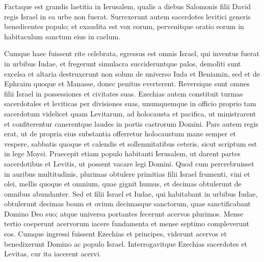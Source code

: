\begin{biblechapter}
\begin{biblechapter}
\begin{biblechapter}
\begin{biblechapter}
\begin{biblechapter}
\begin{biblechapter}
\begin{biblechapter}
\begin{biblechapter}
\begin{biblechapter}
\begin{biblechapter}
\begin{biblechapter}
\begin{biblechapter}
\begin{biblechapter}
\begin{biblechapter}
\begin{biblechapter}
\begin{biblechapter}
\begin{biblechapter}
\begin{biblechapter}
\begin{biblechapter}
\begin{biblechapter}
\begin{biblechapter}
\begin{biblechapter}
\begin{biblechapter}
\begin{biblechapter}
\begin{biblechapter}
\begin{biblechapter}
\begin{biblechapter}
\begin{biblechapter}
\begin{biblechapter}
\begin{biblechapter}
\verse Factaque est grandis laetitia in Ierusalem, qualis a diebus Salomonis filii David regis Israel in ea urbe non fuerat. 
\verse Surrexerunt autem sacerdotes levitici generis benedicentes populo; et exaudita est vox eorum, pervenitque oratio eorum in habitaculum sanctum eius in caelum.
 
\begin{biblechapter}
\verse Cumque haec fuissent rite celebrata, egressus est omnis Israel, qui inventus fuerat in urbibus Iudae, et fregerunt simulacra succideruntque palos, demoliti sunt excelsa et altaria destruxerunt non solum de universo Iuda et Beniamin, sed et de Ephraim quoque et Manasse, donec penitus everterent. Reversique sunt omnes filii Israel in possessiones et civitates suas.
 \verse Ezechias autem constituit turmas sacerdotales et leviticas per divisiones suas, unumquemque in officio proprio tam sacerdotum videlicet quam Levitarum, ad holocausta et pacifica, ut ministrarent et confiterentur canerentque laudes in portis castrorum Domini.
 \verse Pars autem regis erat, ut de propria eius substantia offerretur holocaustum mane semper et vespere, sabbatis quoque et calendis et sollemnitatibus ceteris, sicut scriptum est in lege Moysi.
 \verse Praecepit etiam populo habitanti Ierusalem, ut darent partes sacerdotibus et Levitis, ut possent vacare legi Domini.
 \verse Quod cum percrebruisset in auribus multitudinis, plurimas obtulere primitias filii Israel frumenti, vini et olei, mellis quoque et omnium, quae gignit humus, et decimas obtulerunt de omnibus abundanter. 
\verse Sed et filii Israel et Iudae, qui habitabant in urbibus Iudae, obtulerunt decimas boum et ovium decimasque sanctorum, quae sanctificabant Domino Deo suo; atque universa portantes fecerunt acervos plurimos.
 \verse Mense tertio coeperunt acervorum iacere fundamenta et mense septimo compleverunt eos. 
\verse Cumque ingressi fuissent Ezechias et principes, viderunt acervos et benedixerunt Domino ac populo Israel. 
\verse Interrogavitque Ezechias sacerdotes et Levitas, cur ita iacerent acervi. 

\end{biblechapter}
\end{biblechapter}
\end{biblechapter}
\end{biblechapter}
\end{biblechapter}
\end{biblechapter}
\end{biblechapter}
\end{biblechapter}
\end{biblechapter}
\end{biblechapter}
\end{biblechapter}
\end{biblechapter}
\end{biblechapter}
\end{biblechapter}
\end{biblechapter}
\end{biblechapter}
\end{biblechapter}
\end{biblechapter}
\end{biblechapter}
\end{biblechapter}
\end{biblechapter}
\end{biblechapter}
\end{biblechapter}
\end{biblechapter}
\end{biblechapter}
\end{biblechapter}
\end{biblechapter}
\end{biblechapter}
\end{biblechapter}
\end{biblechapter}
\end{biblechapter}
